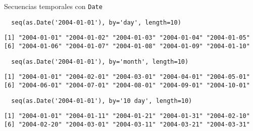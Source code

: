 \documentclass[xcolor={usenames,svgnames,dvipsnames}]{beamer}
\begin{document}
\begin{frame}[fragile,label=sec-2-2]{Secuencias temporales con \texttt{Date}}
 \lstset{language=R,label= ,caption= ,numbers=none}
\begin{lstlisting}
  seq(as.Date('2004-01-01'), by='day', length=10)
\end{lstlisting}

\begin{verbatim}
[1] "2004-01-01" "2004-01-02" "2004-01-03" "2004-01-04" "2004-01-05"
[6] "2004-01-06" "2004-01-07" "2004-01-08" "2004-01-09" "2004-01-10"
\end{verbatim}

\lstset{language=R,label= ,caption= ,numbers=none}
\begin{lstlisting}
  seq(as.Date('2004-01-01'), by='month', length=10)
\end{lstlisting}

\begin{verbatim}
[1] "2004-01-01" "2004-02-01" "2004-03-01" "2004-04-01" "2004-05-01"
[6] "2004-06-01" "2004-07-01" "2004-08-01" "2004-09-01" "2004-10-01"
\end{verbatim}

\lstset{language=R,label= ,caption= ,numbers=none}
\begin{lstlisting}
  seq(as.Date('2004-01-01'), by='10 day', length=10)
\end{lstlisting}

\begin{verbatim}
[1] "2004-01-01" "2004-01-11" "2004-01-21" "2004-01-31" "2004-02-10"
[6] "2004-02-20" "2004-03-01" "2004-03-11" "2004-03-21" "2004-03-31"
\end{verbatim}
\end{frame}
\end{document}
